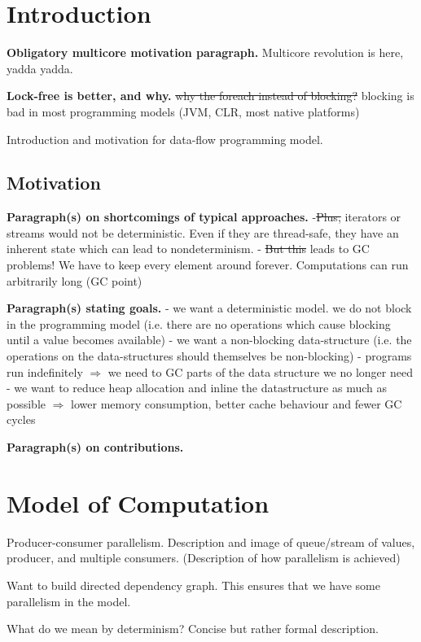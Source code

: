 \documentclass[runningheads,a4paper]{llncs}
\begin{document}
\section{Introduction}

\textbf{Obligatory multicore motivation paragraph.} Multicore revolution is here, yadda yadda.

\textbf{Lock-free is better, and why.} 
\sout{why the foreach instead of blocking?} blocking is bad in most
   programming models (JVM, CLR, most native platforms)

Introduction and motivation for data-flow programming model.


\subsection{Motivation}

\textbf{Paragraph(s) on shortcomings of typical approaches.} 
-\sout{Plus,} iterators or streams would not be deterministic. Even if they
are thread-safe, they have an inherent state which can lead to nondeterminism.
- \sout{But this} leads to GC problems! We have to keep every element around
forever. Computations can run arbitrarily long (GC point)

\textbf{Paragraph(s) stating goals.} 
- we want a deterministic model. we do not block in the programming model (i.e. there are no
operations which cause blocking until a value becomes available)
- we want a non-blocking data-structure (i.e. the operations on the
data-structures should themselves be non-blocking)
- programs run indefinitely $\Rightarrow$ we need to GC parts of the
data structure we no longer need
- we want to reduce heap allocation and inline the datastructure as
much as possible $\Rightarrow$ lower memory consumption, better cache behaviour
and fewer GC cycles

\textbf{Paragraph(s) on contributions.} 

\section{Model of Computation}

Producer-consumer parallelism. Description and image of queue/stream of values, producer, and multiple consumers. (Description of how parallelism is achieved)

Want to build directed dependency graph. This ensures that we have some parallelism in the model. 

What do we mean by determinism? Concise but rather formal description.
\end{document}
